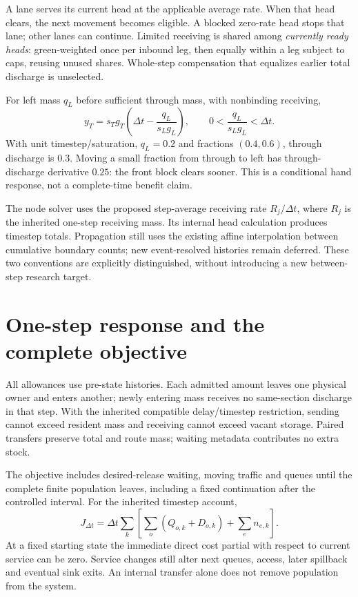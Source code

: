 \documentclass[11pt,a4paper]{article}
\begin{document}
A lane serves its current head at the applicable average rate. When that
head clears, the next movement becomes eligible. A blocked zero-rate head
stops that lane; other lanes can continue. Limited receiving is shared
among \emph{currently ready heads}: green-weighted once per inbound leg,
then equally within a leg subject to caps, reusing unused shares. Whole-step
compensation that equalizes earlier total discharge is unselected.

For left mass $q_L$ before sufficient through mass, with nonbinding receiving,
\begin{equation}
 y_T=s_Tg_T\left(\Delta t-\frac{q_L}{s_Lg_L}\right),
 \qquad 0<\frac{q_L}{s_Lg_L}<\Delta t.
 \label{eq:compact-service}
\end{equation}
With unit timestep/saturation, $q_L=0.2$ and fractions $(0.4,0.6)$,
through discharge is $0.3$. Moving a small fraction from through to left
has through-discharge derivative $0.25$: the front block clears sooner.
This is a conditional hand response, not a complete-time benefit claim.

The node solver uses the proposed step-average receiving rate
$R_j/\Delta t$, where $R_j$ is the inherited one-step receiving mass.
Its internal head calculation produces timestep totals. Propagation still
uses the existing affine interpolation between cumulative boundary counts;
new event-resolved histories remain deferred. These two conventions are
explicitly distinguished, without introducing a new between-step research
target.

\section{One-step response and the complete objective}

All allowances use pre-state histories. Each admitted amount leaves one
physical owner and enters another; newly entering mass receives no
same-section discharge in that step. With the inherited compatible
delay/timestep restriction, sending cannot exceed resident mass and
receiving cannot exceed vacant storage. Paired transfers preserve total
and route mass; waiting metadata contributes no extra stock.

The objective includes desired-release waiting, moving traffic and queues
until the complete finite population leaves, including a fixed continuation
after the controlled interval. For the inherited timestep account,
\begin{equation}
 J_{\Delta t}=\Delta t\sum_k
 \left[\sum_o(Q_{o,k}+D_{o,k})+\sum_en_{e,k}\right].
 \label{eq:compact-tst}
\end{equation}
At a fixed starting state the immediate direct cost partial with respect
to current service can be zero. Service changes still alter next queues,
access, later spillback and eventual sink exits. An internal transfer
alone does not remove population from the system.
\end{document}
